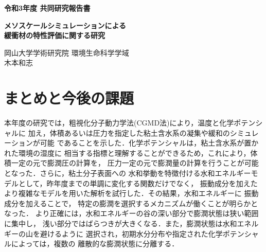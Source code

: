 ﻿\documentclass[11pt,a4j]{jarticle}
\newlength{\minitwocolumn}
\begin{document}
\newcommand{\fat}[1]{\mbox{\boldmath $#1$}}
\newcommand{\D}{\partial}
\newcommand{\w}{\omega}
\newcommand{\ga}{\alpha}
\newcommand{\gb}{\beta}
\newcommand{\gx}{\xi}
\newcommand{\gz}{\zeta}
\newcommand{\vhat}[1]{\hat{\fat{#1}}}
\newcommand{\spc}{\vspace{0.7\baselineskip}}
\newcommand{\halfspc}{\vspace{0.3\baselineskip}}

\newcommand{\twofig}[2]
 {
   \begin{figure}[h]
     \begin{minipage}[t]{\minitwocolumn}
         \begin{center}   #1
         \end{center}
     \end{minipage}
         \hspace{\columnsep}
     \begin{minipage}[t]{\minitwocolumn}
         \begin{center} #2
         \end{center}
     \end{minipage}
   \end{figure}
 }
\begin{center}
{\Large \bf 令和3年度 共同研究報告書}
\end{center}
\vspace{2mm}
\begin{center}
{\LARGE \bf 
メソスケールシミュレーションによる\\緩衝材の特性評価に関する研究} 
\end{center}
\begin{center}
岡山大学学術研究院 環境生命科学学域\\
木本和志
\end{center}
\vspace{10mm}
	


%
\section{まとめと今後の課題}
\hspace{\parindent}
本年度の研究では，粗視化分子動力学法(CGMD法)により，温度と化学ポテンシャルに
加え，体積あるいは圧力を指定した粘土含水系の凝集や緩和のシミュレーションが可能
であることを示した．化学ポテンシャルは，粘土含水系が置かれた環境の湿度に
相当する指標と理解することができるため，これにより，体積一定の元で膨潤圧の計算を，
圧力一定の元で膨潤量の計算を行うことが可能となった．さらに，粘土分子表面への
水和挙動を特徴付ける水和エネルギーモデルとして，昨年度までの単調に変化する関数だけでなく，
振動成分を加えたより複雑なモデルを用いた解析を試行した．その結果，水和エネルギーに
振動成分を加えることで， 特定の膨潤を選択するメカニズムが働くことが明らかとなった．
より正確には，水和エネルギーの谷の深い部分で膨潤状態は狭い範囲に集中し，
浅い部分ではばらつきが大きくなる．また，膨潤状態は水和エネルギーの山を避けるように
選択され，初期水分分布や指定された化学ポテンシャルによっては，複数の
離散的な膨潤状態に分離する．
\end{document}
